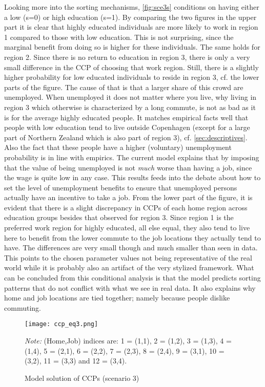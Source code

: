 Looking more into the sorting mechanisms, \autoref{fig:sce3s} conditions on having either a low (s=0) or high education (s=1). By comparing the two figures in the upper part it is clear that highly educated individuals are more likely to work in region 1 compared to those with low education. This is not surprising, since the marginal benefit from doing so is higher for these individuals. The same holds for region 2. Since there is no return to education in region 3, there is only a very small difference in the CCP of choosing that work region. Still, there is a slightly higher probability for low educated individuals to reside in region 3, cf. the lower parts of the figure. The cause of that is that a larger share of this crowd are unemployed. When unemployed it does not matter where you live, why living in region 3 which otherwise is characterized by a long commute, is not as bad as it is for the average highly educated people. It matches empirical facts well that people with low education tend to live outside Copenhagen (except for a large part of Northern Zealand which is also part of region 3), cf. \autoref{sec:descriptives}. Also the fact that these people have a higher (voluntary) unemployment probability is in line with empirics. The current model explains that by imposing that the value of being unemployed is not \textit{much} worse than having a job, since the wage is quite low in any case. This results feeds into the debate about how to set the level of unemployment benefits to ensure that unemployed persons actually have an incentive to take a job. From the lower part of the figure, it is evident that there is a slight discrepancy in CCPs of each home region across education groups besides that observed for region 3. Since region 1 is the preferred work region for highly educated, all else equal, they also tend to live here to benefit from the lower commute to the job locations they actually tend to have. The differences are very small though and much smaller than seen in data. This points to the chosen parameter values not being representative of the real world while it is probably also an artifact of the very stylized framework. What can be concluded from this conditional analysis is that the model predicts sorting patterns that do not conflict with what we see in real data. It also explains why home and job locations are tied together; namely because people dislike commuting. 

\begin{figure}
\centering
\begin{minipage}{0.7\textwidth}
\texttt{[image: ccp\_eq3.png]} 
{\footnotesize \emph{Note:} (Home,Job) indices are: 1 = (1,1), 2 = (1,2), 3 = (1,3), 4 = (1,4), 5 = (2,1), 6 = (2,2), 7 = (2,3), 8 = (2,4), 9 = (3,1), 10 = (3,2), 11 = (3,3) and 12 = (3,4). \par}
\end{minipage}
\caption{Model solution of CCPs (scenario 3)}
\label{fig:sce3}
\end{figure}

